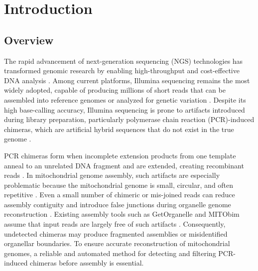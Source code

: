 
\chapter{Introduction}

\section{Overview}\label{subsec:overview}

The rapid advancement of next-generation sequencing (NGS) technologies has transformed genomic research by enabling high-throughput and cost-effective DNA analysis \citep{Metzker2010}. Among current platforms, Illumina sequencing remains the most widely adopted, capable of producing millions of short reads that can be assembled into reference genomes or analyzed for genetic variation \citep{Bentley2008,Glenn2011}. Despite its high base-calling accuracy, Illumina sequencing is prone to artifacts introduced during library preparation, particularly polymerase chain reaction (PCR)-induced chimeras, which are artificial hybrid sequences that do not exist in the true genome \citep{Judo1998}.

PCR chimeras form when incomplete extension products from one template anneal to an unrelated DNA fragment and are extended, creating recombinant reads \citep{Qiu2001}. In mitochondrial genome assembly, such artifacts are especially problematic because the mitochondrial genome is small, circular, and often repetitive \citep{Boore1999,Cameron2014}. Even a small number of chimeric or mis-joined reads can reduce assembly contiguity and introduce false junctions during organelle genome reconstruction \citep{Hahn2013,Dierckxsens2017,Jin2020}. Existing assembly tools such as GetOrganelle and MITObim assume that input reads are largely free of such artifacts \citep{Hahn2013,Jin2020}. Consequently, undetected chimeras may produce fragmented assemblies or misidentified organellar boundaries. To ensure accurate reconstruction of mitochondrial genomes, a reliable and automated method for detecting and filtering PCR-induced chimeras before assembly is essential.

